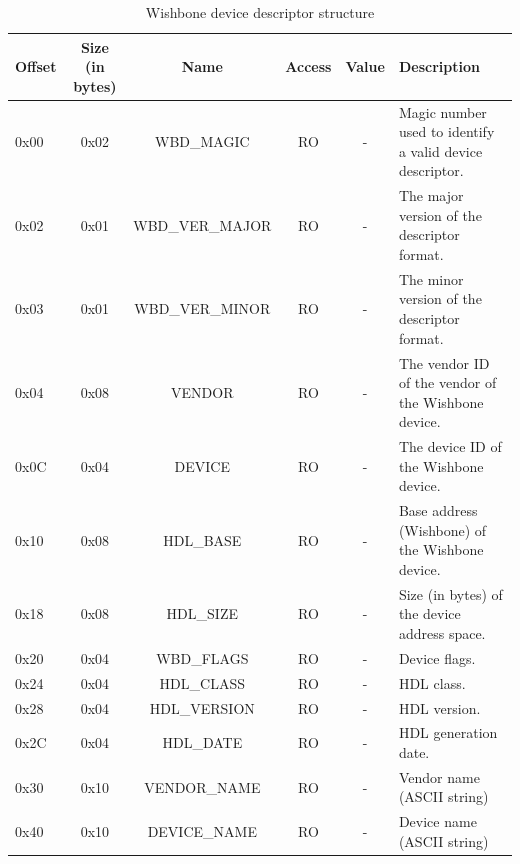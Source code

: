 \documentclass{article}
\begin{document}
\begin{center}
	\begin{savenotes}
	\begin{table}[!ht]\footnotesize
	\caption{Wishbone device descriptor structure}\label{dev_desc_struct}\centering
	\begin{tabular}{| l | c | c | c | c | p{5cm} |} \hline
	Offset & Size (in bytes) & Name & Access & Value & Description \\ \hline
	0x00 & 0x02 & WBD\_MAGIC & RO & - & Magic number used to identify a valid device descriptor. \\ \hline
	0x02 & 0x01 & WBD\_VER\_MAJOR & RO & - & The major version of the descriptor format. \\ \hline
	0x03 & 0x01 & WBD\_VER\_MINOR & RO & - & The minor version of the descriptor format. \\ \hline
	0x04 & 0x08 & VENDOR & RO & - & The vendor ID of the vendor of the Wishbone device. \\ \hline
	0x0C & 0x04 & DEVICE & RO & - & The device ID of the Wishbone device. \\ \hline
	0x10 & 0x08 & HDL\_BASE & RO & - & Base address (Wishbone) of the Wishbone device. \\ \hline
	0x18 & 0x08 & HDL\_SIZE & RO & - & Size (in bytes) of the device address space. \\ \hline
	0x20 & 0x04 & WBD\_FLAGS & RO & - & Device flags. \\ \hline
	0x24 & 0x04 & HDL\_CLASS & RO & - & HDL class. \\ \hline
	0x28 & 0x04 & HDL\_VERSION & RO & - & HDL version. \\ \hline
	0x2C & 0x04 & HDL\_DATE & RO & - & HDL generation date. \\ \hline
	0x30 & 0x10 & VENDOR\_NAME & RO & - & Vendor name (ASCII string) \\ \hline
	0x40 & 0x10 & DEVICE\_NAME & RO & - & Device name (ASCII string) \\ \hline
	\end{tabular}
	\end{table}
	\end{savenotes}
\end{center}
\end{document}
